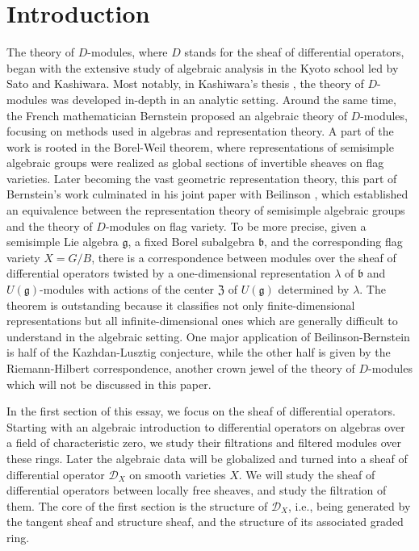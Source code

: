 \documentclass[11pt, a4paper]{article}
\theoremstyle{definition}
\renewcommand{\b}{\mathfrak b}
\newcommand{\g}{\mathfrak g}
\begin{document}
    \newpage
    \tableofcontents
    \section{Introduction}
    The theory of $D$-modules, where $D$ stands for the sheaf of differential operators, began with the extensive study of algebraic analysis in the Kyoto school led by Sato and Kashiwara. Most notably, in Kashiwara's thesis \cite{kashiwara-master}, the theory of $D$-modules was developed in-depth in an analytic setting. Around the same time, the French mathematician Bernstein proposed an algebraic theory of $D$-modules, focusing on methods used in algebras and representation theory. A part of the work is rooted in the Borel-Weil theorem, where representations of semisimple algebraic groups were realized as global sections of invertible sheaves on flag varieties. Later becoming the vast geometric representation theory, this part of Bernstein's work culminated in his joint paper with Beilinson \cite{bb-original}, which established an equivalence between the representation theory of semisimple algebraic groups and the theory of $D$-modules on flag variety. To be more precise, given a semisimple Lie algebra $\g$, a fixed Borel subalgebra $\b$, and the corresponding flag variety $X=G/B$, there is a correspondence between modules over the sheaf of differential operators twisted by a one-dimensional representation $\lambda$ of $\b$ and $U(\g)$-modules with actions of the center $\mathfrak Z$ of $U(\g)$ determined by $\lambda$. The theorem is outstanding because it classifies not only finite-dimensional representations but all infinite-dimensional ones which are generally difficult to understand in the algebraic setting. One major application of Beilinson-Bernstein is half of the Kazhdan-Lusztig conjecture, while the other half is given by the Riemann-Hilbert correspondence, another crown jewel of the theory of $D$-modules which will not be discussed in this paper.

    In the first section of this essay, we focus on the sheaf of differential operators. Starting with an algebraic introduction to differential operators on algebras over a field of characteristic zero, we study their filtrations and filtered modules over these rings. Later the algebraic data will be globalized and turned into a sheaf of differential operator $\mathcal D_X$ on smooth varieties $X$. We will study the sheaf of differential operators between locally free sheaves, and study the filtration of them. The core of the first section is the structure of $\mathcal D_X$, i.e., being generated by the tangent sheaf and structure sheaf, and the structure of its associated graded ring.
\end{document}
